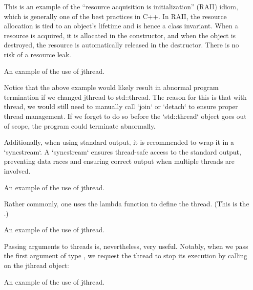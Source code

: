 This is an example of the ``resource acquisition is initialization'' (RAII) idiom, which is generally one of the best practices in C++. In RAII, the resource allocation is tied to an object's lifetime and is hence a class invariant. When a resource is acquired, it is allocated in the constructor, and when the object is destroyed, the resource is automatically released in the destructor. There is no risk of a resource leak. 

\raggedbottom
\begin{codebox}[]{\href{https://godbolt.org/z/eWrfrsd7K}{\ExternalLink}}
\footnotesize An example of the use of jthread.
\tcblower
{}
\end{codebox}

Notice that the above example would likely result in abnormal program termination if we changed jthread to std::thread. The reason for this is that with thread, we would still need to manually call `join` or `detach` to ensure proper thread management. If we forget to do so before the `std::thread` object goes out of scope, the program could terminate abnormally.

Additionally, when using standard output, it is recommended to wrap it in a `syncstream`. A `syncstream` ensures thread-safe access to the standard output, preventing data races and ensuring correct output when multiple threads are involved.

\raggedbottom
\begin{codebox}[]{\href{https://godbolt.org/z/rr1GrWqfP}{\ExternalLink}}
\footnotesize An example of the use of jthread.
\tcblower
{}
\end{codebox}

Rather commonly, one uses the lambda function to define the thread. (This is the \cpp{[]()}.) 

\raggedbottom
\begin{codebox}[]{\href{https://godbolt.org/z/7M7h5nEeM}{\ExternalLink}}
\footnotesize An example of the use of jthread.
\tcblower
{}
\end{codebox}

Passing arguments to threads is, nevertheless, very useful. Notably, when we pass the first argument of type , we request the thread to stop its execution by calling  on the jthread object:

\raggedbottom
\begin{codebox}[]{\href{https://godbolt.org/z/rMGGPP88q}{\ExternalLink}}
\footnotesize An example of the use of jthread.
\tcblower
{}
\end{codebox}

